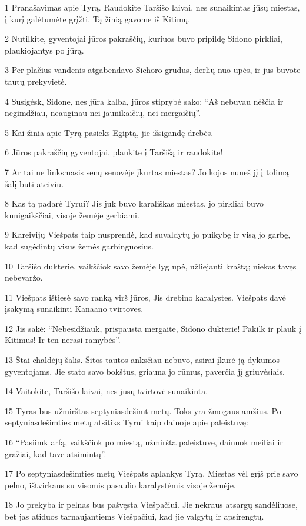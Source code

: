 \par 1 Pranašavimas apie Tyrą. Raudokite Taršišo laivai, nes sunaikintas jūsų miestas, į kurį galėtumėte grįžti. Tą žinią gavome iš Kitimų. 
\par 2 Nutilkite, gyventojai jūros pakraščių, kuriuos buvo pripildę Sidono pirkliai, plaukiojantys po jūrą. 
\par 3 Per plačius vandenis atgabendavo Sichoro grūdus, derlių nuo upės, ir jūs buvote tautų prekyvietė. 
\par 4 Susigėsk, Sidone, nes jūra kalba, jūros stiprybė sako: “Aš nebuvau nėščia ir negimdžiau, neauginau nei jaunikaičių, nei mergaičių”. 
\par 5 Kai žinia apie Tyrą pasieks Egiptą, jie išsigandę drebės. 
\par 6 Jūros pakraščių gyventojai, plaukite į Taršišą ir raudokite! 
\par 7 Ar tai ne linksmasis senų senovėje įkurtas miestas? Jo kojos nuneš jį į tolimą šalį būti ateiviu. 
\par 8 Kas tą padarė Tyrui? Jis juk buvo karališkas miestas, jo pirkliai buvo kunigaikščiai, visoje žemėje gerbiami. 
\par 9 Kareivijų Viešpats taip nusprendė, kad suvaldytų jo puikybę ir visą jo garbę, kad sugėdintų visus žemės garbinguosius. 
\par 10 Taršišo dukterie, vaikščiok savo žemėje lyg upė, užliejanti kraštą; niekas tavęs nebevaržo. 
\par 11 Viešpats ištiesė savo ranką virš jūros, Jis drebino karalystes. Viešpats davė įsakymą sunaikinti Kanaano tvirtoves. 
\par 12 Jis sakė: “Nebesidžiauk, prispausta mergaite, Sidono dukterie! Pakilk ir plauk į Kitimus! Ir ten nerasi ramybės”. 
\par 13 Štai chaldėjų šalis. Šitos tautos anksčiau nebuvo, asirai įkūrė ją dykumos gyventojams. Jie stato savo bokštus, griauna jo rūmus, paverčia jį griuvėsiais. 
\par 14 Vaitokite, Taršišo laivai, nes jūsų tvirtovė sunaikinta. 
\par 15 Tyras bus užmirštas septyniasdešimt metų. Toks yra žmogaus amžius. Po septyniasdešimties metų atsitiks Tyrui kaip dainoje apie paleistuvę: 
\par 16 “Pasiimk arfą, vaikščiok po miestą, užmiršta paleistuve, dainuok meiliai ir gražiai, kad tave atsimintų”. 
\par 17 Po septyniasdešimties metų Viešpats aplankys Tyrą. Miestas vėl grįš prie savo pelno, ištvirkaus su visomis pasaulio karalystėmis visoje žemėje. 
\par 18 Jo prekyba ir pelnas bus pašvęsta Viešpačiui. Jie nekraus atsargų sandėliuose, bet jas atiduos tarnaujantiems Viešpačiui, kad jie valgytų ir apsirengtų.



